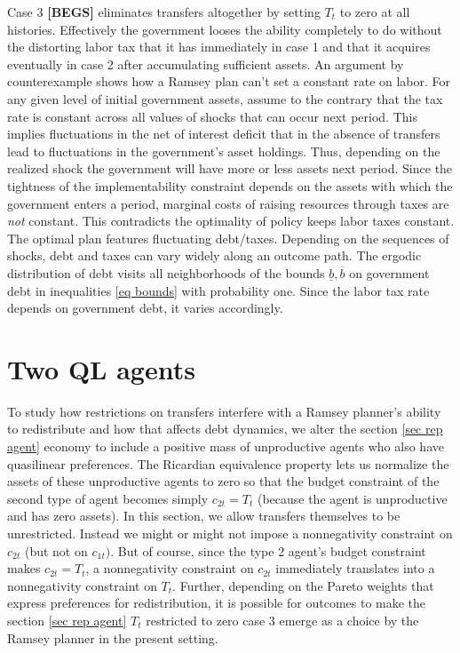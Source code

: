 \documentclass[thmsb,11pt]{article}
\begin{document}
Case 3 \textbf{[BEGS]} eliminates transfers altogether  by setting $T_t$ to zero at all histories. Effectively the government looses the ability  completely to do without the distorting labor tax that it has immediately in case 1 and that it acquires eventually in case 2 after accumulating sufficient assets.    An argument by counterexample shows how a Ramsey plan can't  set a constant rate on labor. For any given level of initial government  assets, assume to the contrary that the  tax rate is constant across all values of shocks that can occur  next period. This implies fluctuations in the net of interest deficit that in the absence of  transfers lead to  fluctuations in the government's asset holdings.
 Thus,  depending on the realized shock the government will have more or less assets  next period. Since the tightness of the implementability constraint depends on the assets with which the government enters a period, marginal costs of raising resources through taxes are \emph{not} constant. This contradicts the optimality of  policy keeps  labor taxes constant. The optimal plan features fluctuating debt/taxes.  Depending on the sequences of shocks, debt and taxes can vary widely along an outcome path. The ergodic distribution of debt visits all neighborhoods of the bounds $\underline{b},\overline{b}$ on government debt in inequalities  \eqref{eq bounds} with probability one. Since the labor tax rate  depends on government debt, it varies accordingly.


\section{Two QL agents}
To study how restrictions on transfers interfere with a Ramsey planner's ability to redistribute and how that affects debt dynamics,
 we  alter the section \ref{sec rep agent} economy to include a positive mass of unproductive agents who also have quasilinear preferences. The Ricardian equivalence property lets us normalize the assets of these unproductive agents to zero so that   the budget constraint
  of the second type of agent becomes simply $c_{2t} = T_t$ (because the agent is unproductive and has zero assets). In this section,
  we allow transfers themselves to be
    unrestricted. Instead we might or might not impose a nonnegativity constraint on $c_{2t}$ (but not on $c_{1t})$. But of course, since the type 2 agent's budget constraint makes $c_{2t} = T_t$, a nonnegativity constraint on $c_{2t}$ immediately translates into a nonnegativity constraint on $T_t$.
Further, depending on the Pareto weights that express preferences for redistribution, it is possible for outcomes to make the
section \ref{sec rep agent}  $T_t$ restricted to zero case 3 emerge as a choice by the Ramsey planner in the present setting.
\end{document}
